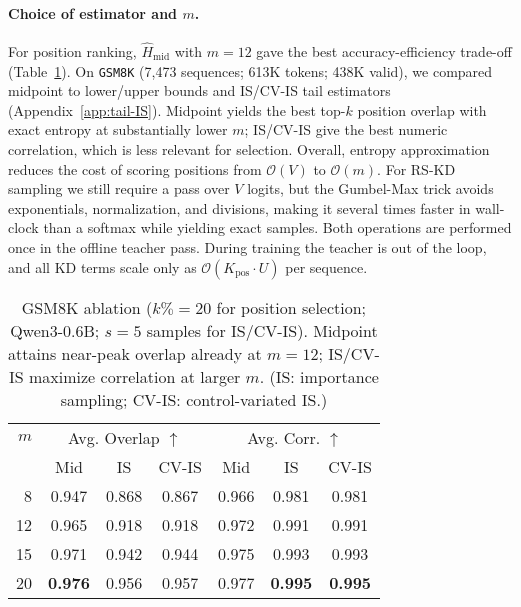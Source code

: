\documentclass[11pt]{article}
\begin{document}
\paragraph{Choice of estimator and $m$.}
For position ranking, $\widehat{H}_{\text{mid}}$ with $m{=}12$ gave the best accuracy-efficiency trade-off (Table~\ref{tab:entropy-ablation}).
On \texttt{GSM8K} (7{,}473 sequences; 613K tokens; 438K valid), we compared midpoint to lower/upper bounds and IS/CV-IS tail estimators (Appendix~\ref{app:tail-IS}).
Midpoint yields the best top-$k$ position overlap with exact entropy at substantially lower $m$; IS/CV-IS give the best numeric correlation, which is less relevant for selection.
Overall, entropy approximation reduces the cost of scoring positions from $\mathcal{O}(V)$ to $\mathcal{O}(m)$.
For RS-KD sampling we still require a pass over $V$ logits, but the Gumbel-Max trick avoids exponentials, normalization, and divisions, making it several times faster in wall-clock than a softmax while yielding exact samples.
Both operations are performed once in the offline teacher pass.
During training the teacher is out of the loop, and all KD terms scale only as $\mathcal{O}(K_{\text{pos}}\!\cdot\!U)$ per sequence.

\vspace{-0.5em}
\begin{table}[h]
	\centering
	\small
	\setlength{\tabcolsep}{6pt}
	\begin{tabular}{rcccccc}
		\toprule
		$m$ & \multicolumn{3}{c}{Avg. Overlap $\uparrow$} & \multicolumn{3}{c}{Avg. Corr. $\uparrow$}                                                   \\
		\cmidrule(lr){2-4}\cmidrule(lr){5-7}
		    & Mid                                         & IS                                        & CV-IS & Mid   & IS             & CV-IS          \\
		\midrule
		8   & 0.947                                       & 0.868                                     & 0.867 & 0.966 & 0.981          & 0.981          \\
		12  & 0.965                                       & 0.918                                     & 0.918 & 0.972 & 0.991          & 0.991          \\
		15  & 0.971                                       & 0.942                                     & 0.944 & 0.975 & 0.993          & 0.993          \\
		20  & \textbf{0.976}                              & 0.956                                     & 0.957 & 0.977 & \textbf{0.995} & \textbf{0.995} \\
		\bottomrule
	\end{tabular}
	\caption{GSM8K ablation ($k\%{=}20$ for position selection; Qwen3-0.6B; $s{=}5$ samples for IS/CV-IS). Midpoint attains near-peak overlap already at $m{=}12$; IS/CV-IS maximize correlation at larger $m$. (IS: importance sampling; CV-IS: control-variated IS.)}
	\label{tab:entropy-ablation}
\end{table}
\vspace{-0.75em}
\end{document}
